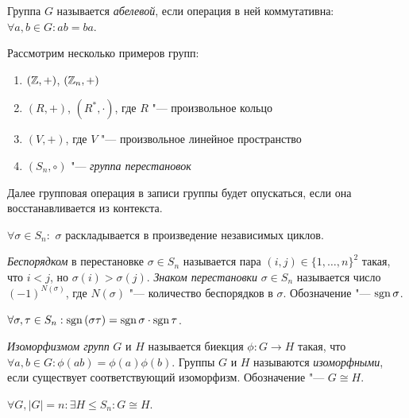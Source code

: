 \begin{definition}
	Группа $G$ называется \textit{абелевой}, если операция в ней коммутативна: $\forall a, b \in G: ab = ba$.
\end{definition}

\begin{example}
	Рассмотрим несколько примеров групп:
	\begin{enumerate}
		\item $(\mathbb{Z}, +)$, $(\mathbb{Z}_n, +)$
		
		\item $(R, +)$, $(R^*, \cdot)$, где $R$ "--- произвольное кольцо
		
		\item $(V, +)$, где $V$ "--- произвольное линейное пространство
		
		\item $(S_n, \circ)$ "--- \textit{группа перестановок}
	\end{enumerate}
	
	Далее групповая операция в записи группы будет опускаться, если она восстанавливается из контекста.
\end{example}

\begin{reminder}
	$\forall \sigma \in S_n:$ $\sigma$ раскладывается в произведение независимых циклов.
\end{reminder}

\begin{reminder}
	\textit{Беспорядком} в перестановке $\sigma \in S_n$ называется пара $(i, j) \in \{1, \dotsc, n\}^2 $ такая, что $i < j$, но $\sigma(i) > \sigma(j)$. \textit{Знаком перестановки} $\sigma \in S_n$ называется число $(-1)^{N(\sigma)}$, где $N(\sigma)$ "--- количество беспорядков в $\sigma$. Обозначение "--- $\operatorname{\mathop{sgn}}{\sigma}$.
\end{reminder}

\begin{reminder}
	$\forall \sigma, \tau \in S_n: \operatorname{\mathop{sgn}}{(\sigma\tau)} = \operatorname{\mathop{sgn}}{\sigma}\cdot\operatorname{\mathop{sgn}}{\tau}$.
\end{reminder}

\begin{definition}
	\textit{Изоморфизмом групп} $G$ и $H$ называется биекция $\phi: G \to H$ такая, что $\forall a, b \in G: \phi(ab) = \phi(a)\phi(b)$. Группы $G$ и $H$ называются \textit{изоморфными}, если существует соответствующий изоморфизм. Обозначение "--- $G \cong H$.
\end{definition}

\begin{reminder}
	$\forall G, |G| = n: \exists H \le S_n: G \cong H$.
\end{reminder}

